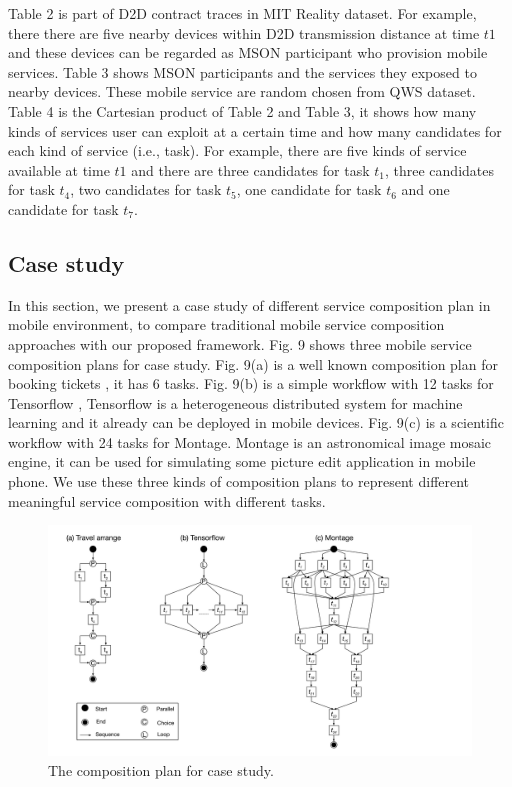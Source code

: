 \documentclass[10pt,journal,compsoc]{IEEEtran}
\begin{document}
Table 2 is part of D2D contract traces in MIT Reality dataset. For example, there there are five nearby devices within D2D transmission distance at time $t1$ and these devices can be regarded as MSON participant who provision mobile services. Table 3 shows MSON participants and the services they exposed to nearby devices. These mobile service are random chosen from QWS dataset. Table 4 is the Cartesian product of Table 2 and Table 3, it shows how many kinds of services user can exploit at a certain time and how many candidates for each kind of service (i.e., task). For example, there are five kinds of service available at time $t1$ and there are three candidates for task $t_1$, three candidates for task $t_4$, two candidates for task $t_5$, one candidate for task $t_6$ and one candidate for task $t_7$.

\subsection{Case study}
In this section, we present a case study of different service composition plan in mobile environment, to compare traditional mobile service composition approaches with our proposed framework. Fig. 9 shows three mobile service composition plans for case study. Fig. 9(a) is a well known composition plan for booking tickets \cite{wu2013transactional}, it has 6 tasks. Fig. 9(b) is a simple workflow with 12 tasks for Tensorflow \cite{abadi2016tensorflow}, Tensorflow is a heterogeneous distributed system for machine learning and it already can be deployed in mobile devices. Fig. 9(c) is a scientific workflow with 24 tasks for Montage. Montage is an astronomical image mosaic engine, it can be used for simulating some picture edit application in mobile phone. We use these three kinds of composition plans to represent different meaningful service composition with different tasks.

\begin{figure}[!t]
\centering
\includegraphics[width=5in]{./img/DAG.pdf}
\caption{The composition plan for case study.}
\label{fig_DAG}
\end{figure}
\end{document}
